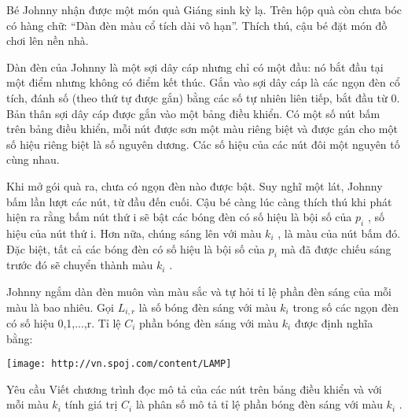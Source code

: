 Bé Johnny nhận được một món quà Giáng sinh kỳ lạ. Trên hộp quà còn chưa bóc có hàng chữ: “Dàn đèn màu cổ tích dài vô hạn”. Thích thú, cậu bé đặt món đồ chơi lên nền nhà.  

   Dàn đèn của Johnny là một sợi dây cáp nhưng chỉ có một đầu: nó bắt đầu tại một điểm nhưng không có điểm kết thúc. Gắn vào sợi dây cáp là các ngọn đèn cổ tích, đánh số (theo thứ tự được gắn) bằng các số tự nhiên liên tiếp, bắt đầu từ 0. Bản thân sợi dây cáp được gắn vào một bảng điều khiển. Có một số nút bấm trên bảng điều khiển, mỗi nút được sơn một màu riêng biệt và được gán cho một số hiệu  riêng biệt là số nguyên dương. Các số hiệu của các nút đôi một nguyên tố cùng nhau.  

   Khi mở gói quà ra, chưa có ngọn đèn nào được bật. Suy nghĩ một lát, Johnny bấm lần lượt các nút, từ đầu đến cuối. Cậu bé càng lúc càng thích thú khi phát hiện ra rằng bấm nút thứ i sẽ bật các bóng đèn có số hiệu là bội số của $p_{i}$   , số hiệu của nút thứ i. Hơn nữa, chúng sáng lên với màu $k_{i}$   , là màu của nút bấm đó. Đặc biệt, tất cả các bóng đèn có số hiệu là bội số của $p_{i}$   mà đã được chiếu sáng trước đó sẽ chuyển thành màu $k_{i}$   .  

   Johnny ngắm dàn đèn muôn vàn màu sắc và tự hỏi tỉ lệ phần đèn sáng của mỗi màu là bao nhiêu. Gọi $L_{i,r}$   là số bóng đèn sáng với màu $k_{i}$   trong số các ngọn đèn có số hiệu 0,1,...,r. Tỉ lệ $C_{i}$   phần bóng đèn sáng với màu $k_{i}$   được định nghĩa bằng:  


\texttt{[image: http://vn.spoj.com/content/LAMP]}

Yêu cầu
Viết chương trình đọc mô tả của các nút trên bảng điều khiển và với mỗi màu $k_{i}$   tính giá trị $C_{i}$   là phân số mô tả tỉ lệ phần bóng đèn sáng với màu $k_{i}$   .